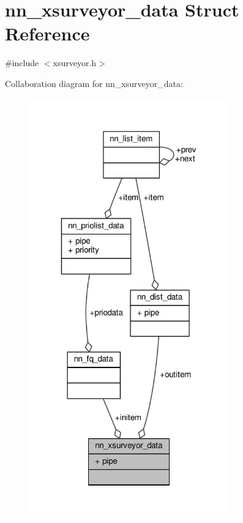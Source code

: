 \hypertarget{structnn__xsurveyor__data}{}\section{nn\+\_\+xsurveyor\+\_\+data Struct Reference}
\label{structnn__xsurveyor__data}


{\ttfamily \#include $<$xsurveyor.\+h$>$}



Collaboration diagram for nn\+\_\+xsurveyor\+\_\+data\+:\nopagebreak
\begin{figure}[H]
\begin{center}
\leavevmode
\includegraphics[width=245pt]{structnn__xsurveyor__data__coll__graph}
\end{center}
\end{figure}
